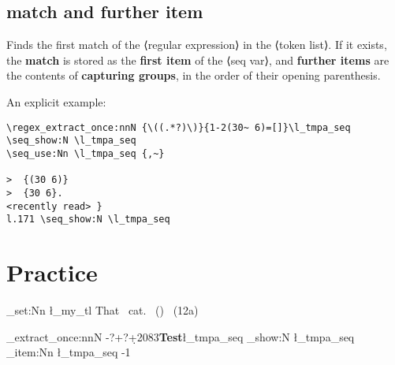 \documentclass{article}
\begin{document}
\subsection{match and further item}
Finds the first match of the ⟨regular expression⟩ in the ⟨token list⟩. If it exists,
the \textbf{match} is stored as the \textbf{first item} of the ⟨seq var⟩, and \textbf{further items} are the contents
of \textbf{capturing groups}, in the order of their opening parenthesis.

An explicit example:
\begin{verbatim}
\regex_extract_once:nnN {\((.*?)\)}{1-2(30~ 6)=[]}\l_tmpa_seq
\seq_show:N \l_tmpa_seq
\seq_use:Nn \l_tmpa_seq {,~}

>  {(30 6)}
>  {30 6}.
<recently read> }
l.171 \seq_show:N \l_tmpa_seq
\end{verbatim}



\section{Practice}
\ExplSyntaxOn
\tl_set:Nn \l_my_tl { That~ cat.~ ()~ (12a)}



\regex_extract_once:nnN {-?+?\d+}{2083\textbf{Test}}\l_tmpa_seq
\seq_show:N \l_tmpa_seq
\seq_item:Nn \l_tmpa_seq {-1}
\ExplSyntaxOff
\end{document}
